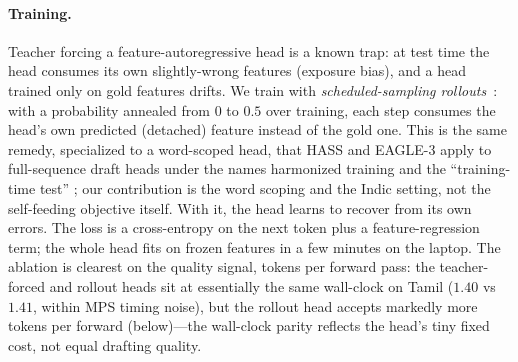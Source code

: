 \paragraph{Training.} Teacher forcing a feature-autoregressive head is a known
trap: at test time the head consumes its own slightly-wrong features (exposure
bias), and a head trained only on gold features drifts. We train with
\emph{scheduled-sampling rollouts}~\citep{bengio2015scheduled}: with a
probability annealed from $0$ to $0.5$ over training, each step consumes the
head's own predicted (detached) feature instead of the gold one. This is the
same remedy, specialized to a word-scoped head, that HASS and
EAGLE-3 apply to full-sequence draft heads under the names
harmonized training and the ``training-time test'' \citep{zhang2025hass,
li2025eagle3}; our contribution is the word scoping and the Indic setting, not
the self-feeding objective itself. With it, the head
learns to recover from its own errors. The loss is a cross-entropy on the next
token plus a feature-regression term; the whole head fits on frozen features in
a few minutes on the laptop. The ablation is clearest on the quality signal,
tokens per forward pass: the teacher-forced and rollout heads sit at essentially
the same wall-clock on Tamil (\x$1.40$ vs \x$1.41$, within MPS timing noise),
but the rollout head accepts markedly more tokens per forward (below)---the
wall-clock parity reflects the head's tiny fixed cost, not equal drafting
quality.

